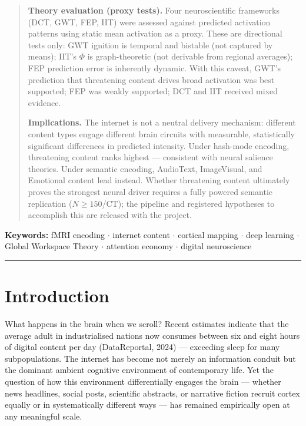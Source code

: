 \documentclass[11pt,letterpaper]{article}
\begin{document}
\begin{abstract}
\noindent\textbf{Theory evaluation (proxy tests).} Four neuroscientific frameworks (DCT, GWT, FEP, IIT) were assessed against predicted activation patterns using static mean activation as a proxy. These are directional tests only: GWT ignition is temporal and bistable (not captured by means); IIT's $\Phi$ is graph-theoretic (not derivable from regional averages); FEP prediction error is inherently dynamic. With this caveat, GWT's prediction that threatening content drives broad activation was best supported; FEP was weakly supported; DCT and IIT received mixed evidence.

\noindent\textbf{Implications.} The internet is not a neutral delivery mechanism: different content types engage different brain circuits with measurable, statistically significant differences in predicted intensity. Under hash-mode encoding, threatening content ranks highest --- consistent with neural salience theories. Under semantic encoding, AudioText, ImageVisual, and Emotional content lead instead. Whether threatening content ultimately proves the strongest neural driver requires a fully powered semantic replication ($N \geq 150$/CT); the pipeline and registered hypotheses to accomplish this are released with the project.
\end{abstract}

\vspace{0.4em}
\noindent\textbf{Keywords:} fMRI encoding $\cdot$ internet content $\cdot$ cortical mapping $\cdot$ deep learning $\cdot$ Global Workspace Theory $\cdot$ attention economy $\cdot$ digital neuroscience

\vspace{1.2em}
{\color{rule}\hrule height 0.8pt}
\vspace{0.8em}

\section{Introduction}

What happens in the brain when we scroll? Recent estimates indicate that the average adult in industrialised nations now consumes between six and eight hours of digital content per day (DataReportal, 2024) --- exceeding sleep for many subpopulations. The internet has become not merely an information conduit but the dominant ambient cognitive environment of contemporary life. Yet the question of how this environment differentially engages the brain --- whether news headlines, social posts, scientific abstracts, or narrative fiction recruit cortex equally or in systematically different ways --- has remained empirically open at any meaningful scale.
\end{document}
